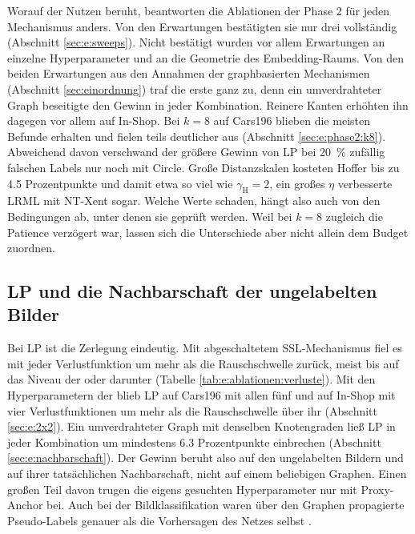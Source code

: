 Worauf der Nutzen beruht, beantworten die Ablationen der Phase 2 für jeden Mechanismus anders. Von den Erwartungen bestätigten sie nur drei vollständig (Abschnitt \ref{sec:e:sweeps}). Nicht bestätigt wurden vor allem Erwartungen an einzelne Hyperparameter und an die Geometrie des Embedding-Raums. Von den beiden Erwartungen aus den Annahmen der graphbasierten Mechanismen (Abschnitt \ref{sec:einordnung}) traf die erste ganz zu, denn ein umverdrahteter Graph beseitigte den Gewinn in jeder Kombination. Reinere Kanten erhöhten ihn dagegen vor allem auf In-Shop. Bei $k=8$ auf Cars196 blieben die meisten Befunde erhalten und fielen teils deutlicher aus (Abschnitt \ref{sec:e:phase2:k8}). Abweichend davon verschwand der größere Gewinn von \ac{LP} bei \qty{20}{\percent} zufällig falschen Labels nur noch mit Circle. Große Distanzskalen kosteten Hoffer bis zu \num{4.5} Prozentpunkte und damit etwa so viel wie $\gamma_{\mathrm{H}}=2$, ein großes $\eta$ verbesserte \ac{LRML} mit \ac{NT-Xent} sogar. Welche Werte schaden, hängt also auch von den Bedingungen ab, unter denen sie geprüft werden. Weil bei $k=8$ zugleich die Patience verzögert war, lassen sich die Unterschiede aber nicht allein dem Budget zuordnen.

\subsection{\acs{LP} und die Nachbarschaft der ungelabelten Bilder}
\label{sec:d:lp}

Bei \ac{LP} ist die Zerlegung eindeutig. Mit abgeschaltetem \ac{SSL}-Mechanismus fiel es mit jeder Verlustfunktion um mehr als die Rauschschwelle zurück, meist bis auf das Niveau der \UEBL oder darunter (Tabelle \ref{tab:e:ablationen:verluste}). Mit den Hyperparametern der \UEBL blieb \ac{LP} auf Cars196 mit allen fünf und auf In-Shop mit vier Verlustfunktionen um mehr als die Rauschschwelle über ihr (Abschnitt \ref{sec:e:2x2}). Ein umverdrahteter Graph mit denselben Knotengraden ließ \ac{LP} in jeder Kombination um mindestens \num{6.3} Prozentpunkte einbrechen (Abschnitt \ref{sec:e:nachbarschaft}). Der Gewinn beruht also auf den ungelabelten Bildern und auf ihrer tatsächlichen Nachbarschaft, nicht auf einem beliebigen Graphen. Einen großen Teil davon trugen die eigens gesuchten Hyperparameter nur mit Proxy-Anchor bei. Auch bei der Bildklassifikation waren über den Graphen propagierte Pseudo-Labels genauer als die Vorhersagen des Netzes selbst \cite{iscen_label_2019}.

